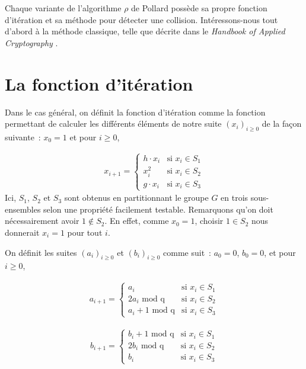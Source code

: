     	Chaque variante de l'algorithme $\rho$ de Pollard possède sa propre fonction d'itération et sa méthode pour détecter une collision. Intéressons-nous tout d'abord à la méthode classique, telle que décrite dans le \textit{Handbook of Applied Cryptography} \autocite[106]{handbook}.

        \section{La fonction d'itération}
        Dans le cas général, on définit la fonction d'itération comme la fonction permettant de calculer les différents éléments de notre suite $(x_i)_{i \ge 0}$ de la façon suivante~: $x_0 = 1$ et pour $i \geq 0$,

        \begin{align*}
          x_{i+1} =
          \begin{cases}
            h \cdot x_i & \text{si } x_i \in S_1 \\
            x_i^2 & \text{si } x_i \in S_2 \\
            g \cdot x_i & \text{si } x_i \in S_3
          \end{cases}
        \end{align*}
        Ici, $S_1$, $S_2$ et $S_3$ sont obtenus en partitionnant le groupe $G$ en trois sous-ensembles selon une propriété facilement testable. Remarquons qu'on doit nécessairement avoir $1 \notin S_2$. En effet, comme $x_0 = 1$, choisir $1 \in S_2$ nous donnerait $x_i = 1$ pour tout $i$.

        On définit les suites ${(a_i)}_{i \geq 0}$ et ${(b_i)}_{i \geq 0}$ comme suit~: $a_0 = 0$, $b_0 = 0$, et pour $i \geq 0$,

        \begin{align*}
          a_{i+1} =
          \begin{cases}
            a_i                   & \text{si } x_i \in S_1 \\
            2a_i \text{\ mod q}    & \text{si } x_i \in S_2 \\
            a_i + 1 \text{\ mod q} & \text{si } x_i \in S_3
          \end{cases}
        \end{align*}

        \begin{align*}
          b_{i+1} =
          \begin{cases}
            b_i + 1 \text{\ mod q} & \text{si } x_i \in S_1 \\
            2b_i \text{\ mod q}    & \text{si } x_i \in S_2 \\
            b_i                   & \text{si } x_i \in S_3
          \end{cases}
        \end{align*}


